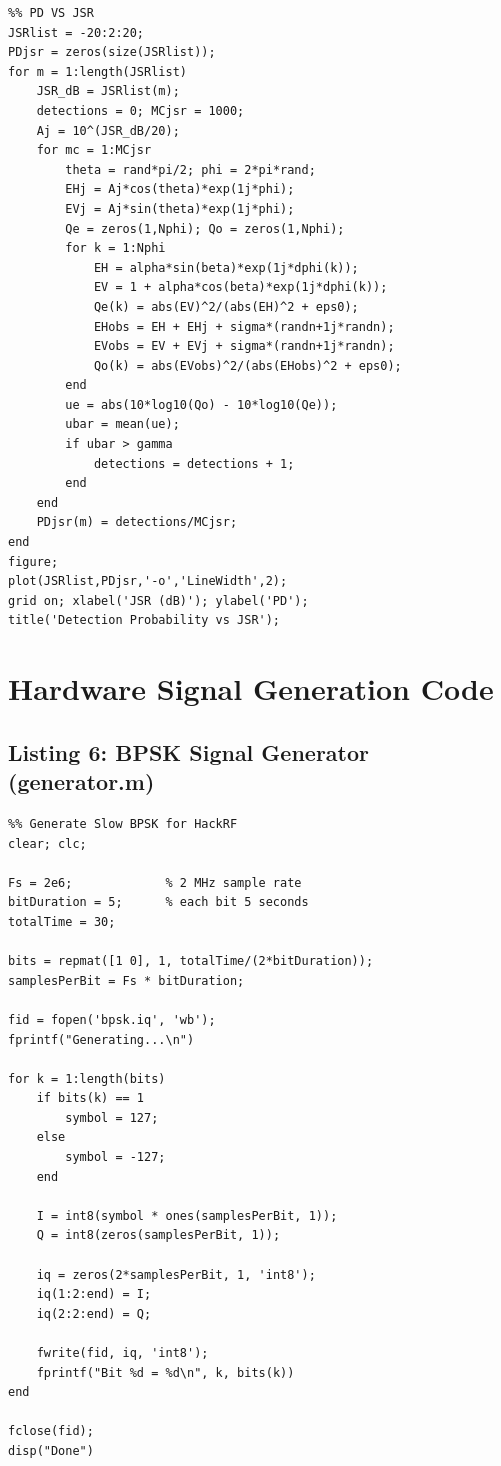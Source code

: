 \documentclass{article}
\begin{document}
\begin{verbatim}
%% PD VS JSR
JSRlist = -20:2:20;
PDjsr = zeros(size(JSRlist));
for m = 1:length(JSRlist)
    JSR_dB = JSRlist(m);
    detections = 0; MCjsr = 1000;
    Aj = 10^(JSR_dB/20);
    for mc = 1:MCjsr
        theta = rand*pi/2; phi = 2*pi*rand;
        EHj = Aj*cos(theta)*exp(1j*phi);
        EVj = Aj*sin(theta)*exp(1j*phi);
        Qe = zeros(1,Nphi); Qo = zeros(1,Nphi);
        for k = 1:Nphi
            EH = alpha*sin(beta)*exp(1j*dphi(k));
            EV = 1 + alpha*cos(beta)*exp(1j*dphi(k));
            Qe(k) = abs(EV)^2/(abs(EH)^2 + eps0);
            EHobs = EH + EHj + sigma*(randn+1j*randn);
            EVobs = EV + EVj + sigma*(randn+1j*randn);
            Qo(k) = abs(EVobs)^2/(abs(EHobs)^2 + eps0);
        end
        ue = abs(10*log10(Qo) - 10*log10(Qe));
        ubar = mean(ue);
        if ubar > gamma
            detections = detections + 1;
        end
    end
    PDjsr(m) = detections/MCjsr;
end
figure;
plot(JSRlist,PDjsr,'-o','LineWidth',2);
grid on; xlabel('JSR (dB)'); ylabel('PD');
title('Detection Probability vs JSR');
\end{verbatim}

\section{Hardware Signal Generation Code}\label{app:hwgen}

\subsection{Listing 6: BPSK Signal Generator (generator.m)}\label{lst:siggen}
\begin{verbatim}
%% Generate Slow BPSK for HackRF
clear; clc;

Fs = 2e6;             % 2 MHz sample rate
bitDuration = 5;      % each bit 5 seconds
totalTime = 30;

bits = repmat([1 0], 1, totalTime/(2*bitDuration));
samplesPerBit = Fs * bitDuration;

fid = fopen('bpsk.iq', 'wb');
fprintf("Generating...\n")

for k = 1:length(bits)
    if bits(k) == 1
        symbol = 127;
    else
        symbol = -127;
    end

    I = int8(symbol * ones(samplesPerBit, 1));
    Q = int8(zeros(samplesPerBit, 1));

    iq = zeros(2*samplesPerBit, 1, 'int8');
    iq(1:2:end) = I;
    iq(2:2:end) = Q;

    fwrite(fid, iq, 'int8');
    fprintf("Bit %d = %d\n", k, bits(k))
end

fclose(fid);
disp("Done")
\end{verbatim}
\end{document}
